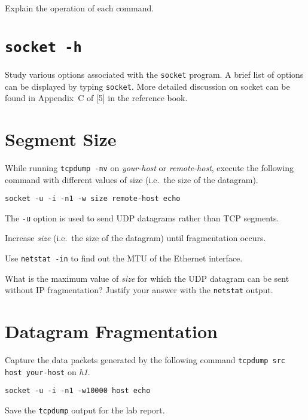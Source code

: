 \documentclass{../UTNetLab}
\begin{document}
    \begin{report}
    \item Explain the operation of each command.
    \end{report}

\section{\texttt{socket -h}}
    Study various options associated with the \lstinline{socket} program.
    A brief list of options can be displayed by typing \lstinline{socket}. More detailed discussion on socket can be found in
    Appendix~C of [5] in the reference book.

\section{Segment Size}
    While running \lstinline{tcpdump -nv} on \textit{your-host} or \textit{remote-host}, execute the following command with different values of size (i.e.\  the size of the datagram).

    \begin{lstlisting}[emph={size, remote-host}]
socket -u -i -n1 -w size remote-host echo
    \end{lstlisting}
    
    The \lstinline{-u} option is used to send UDP datagrams rather than TCP segments.

    Increase \textit{size} (i.e.\  the size of the datagram) until fragmentation occurs.

    Use \lstinline{netstat -in} to find out the MTU of the Ethernet interface.

    \begin{report}
    \item What is the maximum value of \textit{size} for which the UDP datagram can be sent without IP fragmentation?
    Justify your answer with the \lstinline{netstat} output.
    \end{report}

\section{Datagram Fragmentation}
    Capture the data packets generated by the following command \lstinline[emph={your-host, remote-host}]{tcpdump src host your-host} on \textit{h1}.

    \begin{lstlisting}[emph={host}]
socket -u -i -n1 -w10000 host echo
    \end{lstlisting}
    Save the \lstinline{tcpdump} output for the lab report.
    
\end{document}
